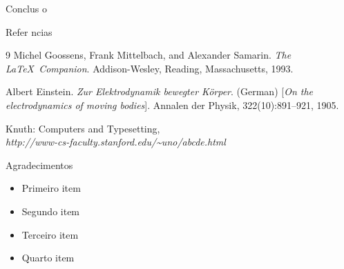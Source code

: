 \documentclass{article}
\begin{document}
\begin{frame}{}
\begin{columns}
    \begin{columnbox} %
        \begin{block}{\Large Conclus o}
            \justifying
            \blindtext[3] %
        \end{block}
        \blindtext[1]
        \begin{block}{\Large Refer ncias}
            \begin{thebibliography}{9}
                Michel Goossens, Frank Mittelbach, and Alexander Samarin. 
                \textit{The \LaTeX\ Companion}. 
                Addison-Wesley, Reading, Massachusetts, 1993.
                 
                Albert Einstein. 
                \textit{Zur Elektrodynamik bewegter K{\"o}rper}. (German) 
                [\textit{On the electrodynamics of moving bodies}]. 
                Annalen der Physik, 322(10):891--921, 1905.
                 
                Knuth: Computers and Typesetting,
                \\\textit{http://www-cs-faculty.stanford.edu/\~{}uno/abcde.html}
            \end{thebibliography}
        \end{block}
        
        \begin{block}{\Large Agradecimentos}
            \justifying
            \begin{itemize}
                \item Primeiro item 
                \item Segundo item
                \item Terceiro item
                \item Quarto item 
            \end{itemize}
        \end{block}
        
    \end{columnbox}

    \end{columns} %
    \end{frame}
\end{document}
